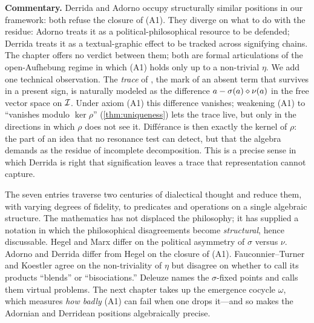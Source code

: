 \textbf{Commentary.} Derrida and Adorno occupy structurally similar
positions in our framework: both refuse the closure of (A1). They
diverge on what to do with the residue: Adorno treats it as a
political-philosophical resource to be defended; Derrida treats it
as a textual-graphic effect to be tracked across signifying chains.
The chapter offers no verdict between them; both are formal
articulations of the open-Aufhebung regime in which (A1) holds only
up to a non-trivial $\eta$.  We add one technical observation. The
\emph{trace} of \citet{Derrida1967}, the mark of an absent term that
survives in a present sign, is naturally modeled as the difference
$a-\sigma(a)\mathbin{\diamond}\nu(a)$ in the free vector space on $\mathcal{I}$.
Under axiom (A1) this difference vanishes; weakening (A1) to
``vanishes modulo $\ker\rho$'' (\cref{thm:uniqueness}) lets the trace
live, but only in the directions in which $\rho$ does not see it.
Différance is then exactly the kernel of $\rho$: the part of an idea
that no resonance test can detect, but that the algebra demands as
the residue of incomplete decomposition. This is a precise sense in
which Derrida is right that signification leaves a trace that
representation cannot capture.

\bigskip

The seven entries traverse two centuries of dialectical thought and
reduce them, with varying degrees of fidelity, to predicates and
operations on a single algebraic structure. The mathematics has not
displaced the philosophy; it has supplied a notation in which the
philosophical disagreements become \emph{structural}, hence
discussable. Hegel and Marx differ on the political asymmetry of
$\sigma$ versus $\nu$. Adorno and Derrida differ from Hegel on the
closure of (A1). Fauconnier--Turner and Koestler agree on the
non-triviality of $\eta$ but disagree on whether to call its
products ``blends'' or ``bisociations.'' Deleuze names the
$\sigma$-fixed points and calls them virtual problems. The next
chapter takes up the emergence cocycle $\omega$, which measures
\emph{how badly} (A1) can fail when one drops it---and so makes the
Adornian and Derridean positions algebraically precise.

